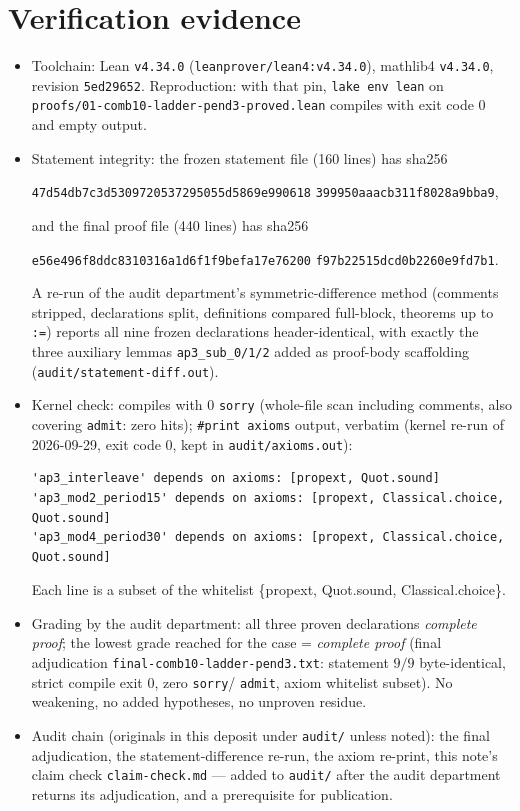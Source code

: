 \documentclass[11pt]{article}
\begin{document}
\section{Verification evidence}

\begin{itemize}
\item Toolchain: Lean \texttt{v4.34.0} (\texttt{leanprover/lean4:v4.34.0}),
mathlib4 \texttt{v4.34.0}, revision \texttt{5ed29652}. Reproduction: with
that pin, \texttt{lake env lean} on
\texttt{proofs/01-comb10-ladder-pend3-proved.lean} compiles with exit code
$0$ and empty output.
\item Statement integrity: the frozen statement file (160 lines) has sha256
\begin{center}
\texttt{47d54db7c3d5309720537295055d5869e990618}\allowbreak
\texttt{399950aaacb311f8028a9bba9},
\end{center}
and the final proof file (440 lines) has sha256
\begin{center}
\texttt{e56e496f8ddc8310316a1d6f1f9befa17e76200}\allowbreak
\texttt{f97b22515dcd0b2260e9fd7b1}.
\end{center}
A re-run of the audit department's symmetric-difference method (comments
stripped, declarations split, definitions compared full-block, theorems up
to \texttt{:=}) reports all nine frozen declarations header-identical, with
exactly the three auxiliary lemmas \texttt{ap3\_sub\_0/1/2} added as
proof-body scaffolding (\texttt{audit/statement-diff.out}).
\item Kernel check: compiles with $0$ \texttt{sorry} (whole-file scan
including comments, also covering \texttt{admit}: zero hits);
\texttt{\#print axioms} output, verbatim (kernel re-run of 2026-09-29,
exit code 0, kept in \texttt{audit/axioms.out}):
\begin{lstlisting}[basicstyle=\ttfamily\footnotesize,frame=none]
'ap3_interleave' depends on axioms: [propext, Quot.sound]
'ap3_mod2_period15' depends on axioms: [propext, Classical.choice, Quot.sound]
'ap3_mod4_period30' depends on axioms: [propext, Classical.choice, Quot.sound]
\end{lstlisting}
Each line is a subset of the whitelist \{propext, Quot.sound,
Classical.choice\}.
\item Grading by the audit department: all three proven declarations
\emph{complete proof}; the lowest grade reached for the case = \emph{complete
proof} (final adjudication \texttt{final-comb10-ladder-pend3.txt}: statement
$9/9$ byte-identical, strict compile exit 0, zero \texttt{sorry}/%
\texttt{admit}, axiom whitelist subset). No weakening, no added hypotheses,
no unproven residue.
\item Audit chain (originals in this deposit under \texttt{audit/} unless
noted): the final adjudication, the statement-difference re-run, the axiom
re-print, this note's claim check \texttt{claim-check.md} --- added to
\texttt{audit/} after the audit department returns its adjudication, and a
prerequisite for publication.
\end{itemize}
\end{document}
